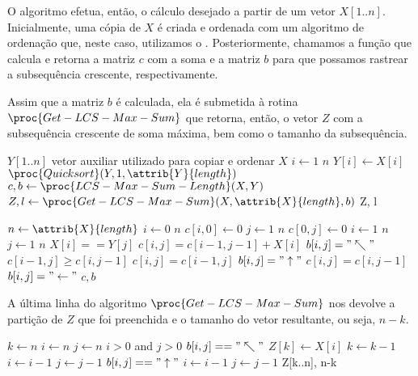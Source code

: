 O algoritmo  efetua, então, o cálculo desejado a partir de um vetor $X[1..n]$. Inicialmente, uma cópia de $X$ é criada e ordenada com um algoritmo de ordenação que, neste caso, utilizamos o . Posteriormente, chamamos a função  que calcula e retorna a matriz $c$ com a soma e a matriz $b$ para que possamos rastrear a subsequência crescente, respectivamente.

Assim que a matriz $b$ é calculada, ela é submetida à rotina $\proc{Get-LCS-Max-Sum}$ que retorna, então, o vetor $Z$ com a subsequência crescente de soma máxima, bem como o tamanho da subsequência.

\begin{codebox}
\li $Y[1..n]$ vetor auxiliar utilizado para copiar e ordenar $X$
\li \For $i \gets 1$ \To $n$
\li \Do
        $Y[i] \gets X[i]$
    \End
\li $\proc{Quicksort}(Y, 1, \attrib{Y}{length})$
\li	$c, b \gets \proc{LCS-Max-Sum-Length}(X, Y)$
\li	$Z, l \gets \proc{Get-LCS-Max-Sum}(X, \attrib{X}{length}, b)$
\li \Return Z, l
\end{codebox}

\begin{codebox}
\li $n \gets \attrib{X}{length}$
\li \For $i \gets 0$ \To $n$
\li \Do
        $c[i, 0] \gets 0$
    \End
\li \For $j \gets 1$ \To $n$
\li \Do
        $c[0, j] \gets 0$
    \End
\li \For $i \gets 1$ \To $n$
\li \Do
        \For $j \gets 1$ \To $n$
\li     \Do
            \If $X[i] == Y[j]$
\li         \Then
                $c[i,j] = c[i-1, j-1] + X[i]$
\li             $b[i,j] = "\nwarrow"$
\li         \ElseIf $c[i-1, j] \ge c[i, j-1]$
\li         \Then
                $c[i,j] = c[i-1, j]$
\li             $b[i,j] = "\uparrow"$
\li         \Else
                $c[i,j] = c[i, j-1]$
\li             $b[i,j] = "\leftarrow"$
            \End
        \End
    \End
\li \Return $c, b$
\end{codebox}

A última linha do algoritmo $\proc{Get-LCS-Max-Sum}$ nos devolve a partição de $Z$ que foi preenchida e o tamanho do vetor resultante, ou seja, $n-k$.

\begin{codebox}
\li $k \gets n$
\li $i \gets n$
\li $j \gets n$
\li \While $i > 0$ and $j > 0$
\li \Do
        \If $b[i,j] == "\nwarrow"$
\li     \Then
            $Z[k] \gets X[i]$
\li         $k \gets k-1$
\li         $i \gets i-1$
\li         $j \gets j-1$
\li     \ElseIf $b[i,j] == "\uparrow"$
\li     \Then
            $i \gets i-1$
\li     \Else
            $j \gets j-1$
        \End     
    \End
\li \Return Z[k..n], n-k
\end{codebox}


